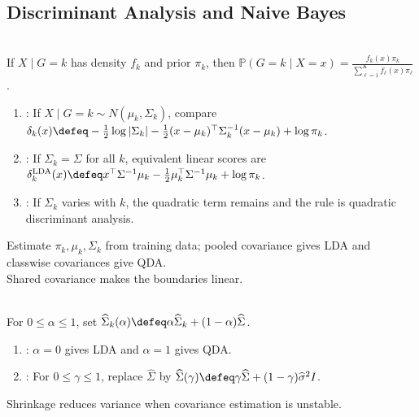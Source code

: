 \subsection{Discriminant Analysis and Naive Bayes}
\begin{method} \label{meth:sl-gaussian-discriminant-analysis} \\
If $X\mid G=k$ has density $f_k$ and prior $\pi_k$, then $\mathbb{P}(G=k\mid X=x)=\frac{f_k(x)\pi_k}{\sum\limits_{\ell=1}^{K}f_\ell(x)\pi_\ell}$.
\begin{enumerate}[label=(\roman*)]
\setlength{\itemsep}{0pt}
\item {}: If $X\mid G=k\sim N(\mu_k,\Sigma_k)$, compare $\delta_k(x)\defeq-\frac{1}{2}\log|\Sigma_k|-\frac{1}{2}(x-\mu_k)^\top\Sigma_k^{-1}(x-\mu_k)+\log\pi_k$.
\item {}: If $\Sigma_k=\Sigma$ for all $k$, equivalent linear scores are $\delta_k^{\mathrm{LDA}}(x)\defeq x^\top\Sigma^{-1}\mu_k-\frac{1}{2}\mu_k^\top\Sigma^{-1}\mu_k+\log\pi_k$.
\item {}: If $\Sigma_k$ varies with $k$, the quadratic term remains and the rule is quadratic discriminant analysis.
\end{enumerate}
Estimate $\pi_k,\mu_k,\Sigma_k$ from training data; pooled covariance gives LDA and classwise covariances give QDA.\\
Shared covariance makes the boundaries linear.
\end{method}

\begin{method} \label{meth:sl-regularized-discriminant-analysis} \\
For $0\leq\alpha\leq1$, set $\widehat{\Sigma}_k(\alpha)\defeq\alpha\widehat{\Sigma}_k+(1-\alpha)\widehat{\Sigma}$.
\begin{enumerate}[label=(\roman*)]
\setlength{\itemsep}{0pt}
\item {}: $\alpha=0$ gives LDA and $\alpha=1$ gives QDA.
\item {}: For $0\leq\gamma\leq1$, replace $\widehat{\Sigma}$ by $\widehat{\Sigma}(\gamma)\defeq\gamma\widehat{\Sigma}+(1-\gamma)\widehat{\sigma}^{2}I$.
\end{enumerate}
Shrinkage reduces variance when covariance estimation is unstable.
\end{method}

